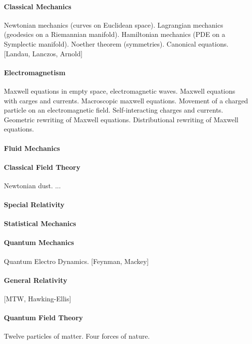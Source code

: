 \paragraph{Classical Mechanics}
Newtonian mechanics (curves on Euclidean space).
Lagrangian mechanics (geodesics on a Riemannian manifold).
Hamiltonian mechanics (PDE on a Symplectic manifold).
Noether theorem (symmetries).
Canonical equations.
[Landau, Lanczos, Arnold]

\paragraph{Electromagnetism}
Maxwell equations in empty space, electromagnetic waves.
Maxwell equations with carges and currents.
Macroscopic maxwell equations.
Movement of a charged particle on an electromagnetic field.
Self-interacting charges and currents.
Geometric rewriting of Maxwell equations.
Distributional rewriting of Maxwell equations.

\paragraph{Fluid Mechanics}

\paragraph{Classical Field Theory}
Newtonian dust. ...

\paragraph{Special Relativity}

\paragraph{Statistical Mechanics}

\paragraph{Quantum Mechanics}
Quantum Electro Dynamics.
[Feynman, Mackey]

\paragraph{General Relativity}
[MTW, Hawking-Ellis]

\paragraph{Quantum Field Theory}
Twelve particles of matter.
Four forces of nature.

